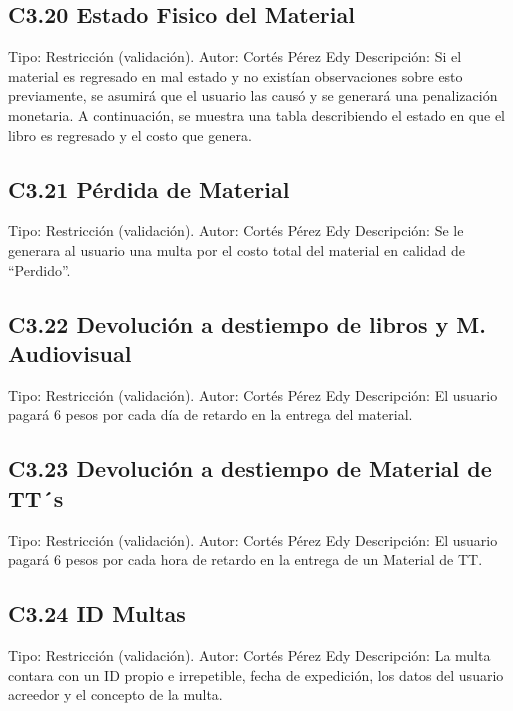 \subsection{C3.20 Estado Fisico del Material }
	\UCli Tipo: Restricción (validación).
	\UCli Autor: Cortés Pérez Edy
	\UCli Descripción: Si el material es regresado en mal estado y no existían observaciones sobre esto previamente, se asumirá que el usuario las causó y se generará una penalización monetaria. A continuación, se muestra una tabla describiendo el estado en que el libro es regresado y el costo que genera.
	
\subsection{C3.21 Pérdida de Material }
	\UCli Tipo: Restricción (validación).
	\UCli Autor: Cortés Pérez Edy
	\UCli Descripción: Se le generara al usuario una multa por el costo total del material en calidad de “Perdido”.
	
\subsection{C3.22 Devolución a destiempo de libros y M. Audiovisual }
	\UCli Tipo: Restricción (validación).
	\UCli Autor: Cortés Pérez Edy
	\UCli Descripción: El usuario pagará 6 pesos por cada día de retardo en la entrega del material.
	
\subsection{C3.23 Devolución a destiempo de Material de TT´s}
	\UCli Tipo: Restricción (validación).
	\UCli Autor: Cortés Pérez Edy
	\UCli Descripción: El usuario pagará 6 pesos por cada hora de retardo en la entrega de un Material de TT.
	
\subsection{C3.24 ID Multas }
	\UCli Tipo: Restricción (validación).
	\UCli Autor: Cortés Pérez Edy
	\UCli Descripción: La multa contara con un ID propio e irrepetible, fecha de expedición, los datos del usuario acreedor y el concepto de la multa.
	
